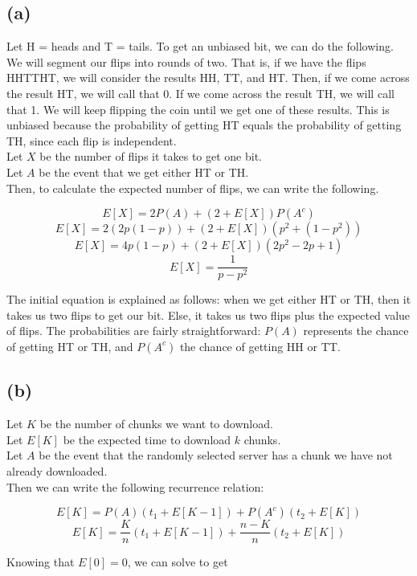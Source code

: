 \documentclass{article}
\begin{document}
\subsection*{(a)}
Let H = heads and T = tails.
To get an unbiased bit, we can do the following. We will segment our flips into
rounds of two. That is, if we have the flips HHTTHT, we will consider the results
HH, TT, and HT. Then, if we come across the result HT, we will call that 0. If we
come across the result TH, we will call that 1. We will keep flipping the coin
until we get one of these results. This is unbiased because the probability of
getting HT equals the probability of getting TH, since each flip is independent. \\

\noindent Let $X$ be the number of flips it takes to get one bit. \\
Let $A$ be the event that we get either HT or TH. \\

\noindent Then, to calculate the expected number of flips, we can write the following.

\[ E[X] = 2 P(A) + (2 + E[X]) P(A^c) \]
\[ E[X] = 2 (2p(1 - p)) + (2 + E[X]) (p^2 + (1 - p^2)) \]
\[ E[X] = 4p(1 - p) + (2 + E[X]) (2p^2 - 2p + 1) \]
\[ E[X] = \frac{1}{p - p^2} \]

\noindent The initial equation is explained as follows: when we get either HT or TH, 
then it takes us two flips to get our bit. Else, it takes us two flips plus the 
expected value of flips. The probabilities are fairly straightforward: $P(A)$ 
represents the chance of getting HT or TH, and $P(A^c)$ the chance of getting HH
or TT.

\subsection*{(b)}
Let $K$ be the number of chunks we want to download.  \\
Let $E[K]$ be the expected time to download $k$ chunks. \\
Let $A$ be the event that the randomly selected server has a chunk we have not already
downloaded. \\

\noindent Then we can write the following recurrence relation:

\[ E[K] = P(A)(t_1 + E[K - 1]) + P(A^c)(t_2 + E[K]) \]
\[ E[K] = \frac{K}{n} (t_1 + E[K - 1]) + \frac{n - K}{n} (t_2 + E[K]) \]

Knowing that $E[0] = 0$, we can solve to get 
\end{document}
